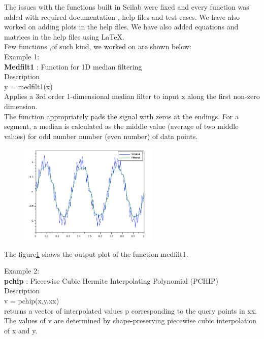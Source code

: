 \documentclass[12pt,a4paper]{report}
\begin{document}
The issues with the functions built in Scilab were fixed and every function was added with required documentation , help files and test cases. We have also worked on adding plots in the help files. We have also added equations and matrices in the help files using LaTeX.\\
Few functions ,of such kind, we worked on are shown below:\\
Example 1:\\
\textbf{Medfilt1} : Function for 1D median filtering\\
Description\\
y = medfilt1(x)\\
Applies a 3rd order 1-dimensional median filter to input x along the first non-zero dimension.\\
The function appropriately pads the signal with zeros at the endings. For a segment, a median is calculated as the middle value (average of two middle values) for odd number number (even number) of data points.\\
\begin{figure}[H]
\centering
\includegraphics[width = 0.6\textwidth]{medfilt1.png}
\label{medfilt1}
\end{figure}
The figure\ref{medfilt1} shows the output plot of the  function medfilt1.


Example 2:\\
\textbf{pchip} : Piecewise Cubic Hermite Interpolating Polynomial (PCHIP)\\
Description\\
v = pchip(x,y,xx) \\
returns a vector of interpolated values p corresponding to the query points in xx. The values of v are determined by shape-preserving piecewise cubic interpolation of x and y.\\
\end{document}
